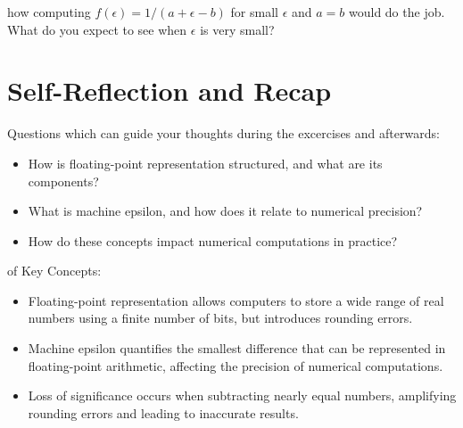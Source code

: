 
 how computing $f(\epsilon) = 1 / (a + \epsilon - b)$ for small $\epsilon$ and $a = b$ would do the job.
What do you expect to see when $\epsilon$ is very small?



\section{Self-Reflection and Recap}

 Questions which can guide your thoughts during the excercises and afterwards:
\begin{itemize}
    \item How is floating-point representation structured, and what are its components?
    \item What is machine epsilon, and how does it relate to numerical precision?
    \item How do these concepts impact numerical computations in practice?
\end{itemize}

 of Key Concepts:
\begin{itemize}
    \item Floating-point representation allows computers to store a wide range of real numbers using a finite number of bits, but introduces rounding errors.
    \item Machine epsilon quantifies the smallest difference that can be represented in floating-point arithmetic, affecting the precision of numerical computations.
    \item Loss of significance occurs when subtracting nearly equal numbers, amplifying rounding errors and leading to inaccurate results.
\end{itemize}


